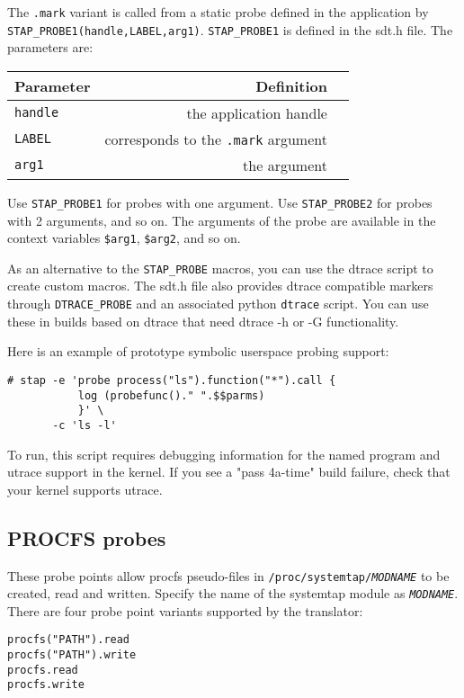\documentclass[twoside,english]{article}
\newenvironment{vindent}
{\begin{list}{}{\setlength{\listparindent}{6pt}}
\item[]}
{\end{list}}
\begin{document}
The \texttt{.mark} variant is called from a static probe defined in
the application by
\texttt{STAP\_PROBE1(handle,LABEL,arg1)}. \texttt{STAP\_PROBE1} is
defined in the sdt.h file.  The parameters are:


\begin{tabular}{|l|r|c|}
  Parameter & Definition \\ \hline
  \texttt{handle} & the application handle \\ \hline
  \texttt{LABEL} & corresponds to the \texttt{.mark} argument \\ \hline
  \texttt{arg1} & the argument \\ \hline
\end{tabular}


Use \texttt{STAP\_PROBE1} for probes with one argument.  Use
\texttt{STAP\_PROBE2} for probes with 2 arguments, and so on.  The
arguments of the probe are available in the context variables
\texttt{\$arg1}, \texttt{\$arg2}, and so on.

As an alternative to the \texttt{STAP\_PROBE} macros, you can use the
dtrace script to create custom macros. The sdt.h file also provides
dtrace compatible markers through \texttt{DTRACE\_PROBE} and an
associated python \texttt{dtrace} script.  You can use these in builds
based on dtrace that need dtrace -h or -G functionality.

Here is an example of prototype symbolic userspace probing support:
\begin{vindent}
\begin{verbatim}
# stap -e 'probe process("ls").function("*").call {
           log (probefunc()." ".$$parms)
           }' \
       -c 'ls -l'
\end{verbatim}
\end{vindent}

To run, this script requires debugging information for the named
program and utrace support in the kernel. If you see a "pass 4a-time"
build failure, check that your kernel supports utrace.



\subsection{PROCFS probes}

These probe points allow procfs pseudo-files in
\texttt{/proc/systemtap/\textit{MODNAME}} to be created, read and
written.  Specify the name of the systemtap module as
\texttt{\textit{MODNAME}}.  There are four probe point variants
supported by the translator:
\begin{vindent}
\begin{verbatim}
procfs("PATH").read
procfs("PATH").write
procfs.read
procfs.write
\end{verbatim}
\end{vindent}
\end{document}
